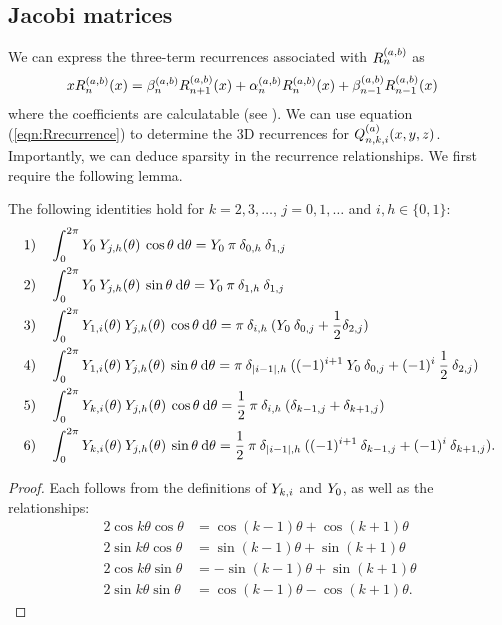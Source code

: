 \documentclass[11pt, oneside]{article}   	%
\begin{document}
\subsection{Jacobi matrices}\label{subsection:jacobimats}

We can express the three-term recurrences associated with $R_n^{(a,b)}$ as
\begin{align}
	x R_n^{(a,b)}(x) &= \beta_n^{(a,b)} R_{n+1}^{(a,b)}(x) + \alpha_n^{(a,b)} R_n^{(a,b)}(x) + \beta_{n-1}^{(a,b)} R_{n-1}^{(a,b)}(x) \label{eqn:Rrecurrence}
\end{align}
where the coefficients are calculatable (see \cite{snowball2019sparse}). We can use equation (\ref{eqn:Rrecurrence}) to determine the 3D recurrences for $Q_{n,k,i}^{(a)}(x,y,z)$. Importantly, we can deduce sparsity in the recurrence relationships.  We first require the following lemma.

\begin{lemma}\label{lemma:Yrecurrence} 
The following identities hold for $k = 2,3,\dots$, $j = 0,1,\dots$ and $i, h \in \{0,1\}$:
\begin{align*}
	&1) \quad \int_0^{2\pi} Y_0 \: Y_{j,h}(\theta) \: \cos\theta \: {\rm d} \theta = Y_0 \: \pi \: \delta_{0,h} \: \delta_{1,j} \\
	&2) \quad \int_0^{2\pi} Y_0 \: Y_{j,h}(\theta) \: \sin\theta \: {\rm d} \theta = Y_0 \: \pi \: \delta_{1,h} \: \delta_{1,j} \\
	&3) \quad \int_0^{2\pi} Y_{1,i}(\theta) \: Y_{j,h}(\theta) \: \cos\theta \: {\rm d} \theta = \pi \: \delta_{i,h} \: (Y_0 \: \delta_{0,j} + \frac{1}{2} \delta_{2,j}) \\
	&4) \quad \int_0^{2\pi} Y_{1,i}(\theta) \: Y_{j,h}(\theta) \: \sin\theta \: {\rm d} \theta = \pi \:  \delta_{|i-1|,h} \: ((-1)^{i+1} \: Y_0 \: \delta_{0,j} + (-1)^i \: \frac{1}{2} \: \delta_{2,j}) \\
	&5) \quad \int_0^{2\pi} Y_{k,i}(\theta) \: Y_{j,h}(\theta) \: \cos\theta \: {\rm d} \theta = \frac{1}{2} \: \pi \: \delta_{i,h} \: (\delta_{k-1,j} + \delta_{k+1,j}) \\
	&6) \quad \int_0^{2\pi} Y_{k,i}(\theta) \: Y_{j,h}(\theta) \: \sin\theta \: {\rm d} \theta = \frac{1}{2} \: \pi \: \delta_{|i-1|,h} \: ((-1)^{i+1} \: \delta_{k-1,j} + (-1)^i \: \delta_{k+1,j}).
\end{align*}
\end{lemma}

\begin{proof}
Each follows from the definitions of $Y_{k,i}$ and $Y_0$, as well as the relationships:
\begin{align*}
	2 \cos k \theta \cos\theta &= \cos (k-1)\theta + \cos(k+1)\theta \\
	2 \sin k \theta \cos\theta &= \sin (k-1)\theta + \sin(k+1)\theta \\
	2 \cos k \theta \sin\theta &= - \sin (k-1)\theta + \sin(k+1)\theta \\
	2 \sin k \theta \sin\theta &= \cos (k-1)\theta - \cos(k+1)\theta.
\end{align*}
\end{proof}
\end{document}

